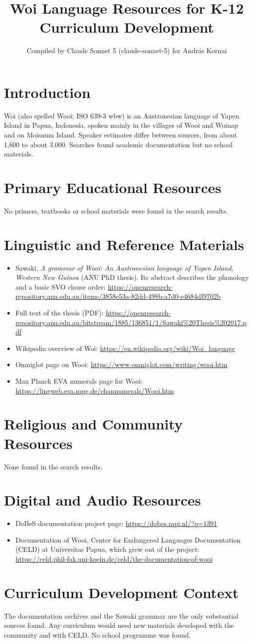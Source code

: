 \documentclass[12pt]{article}
\title{Woi Language Resources for K-12 Curriculum Development}
\author{Compiled by Claude Sonnet 5 (claude-sonnet-5) for Andr\'as Kornai}
\date{}
\begin{document}
\maketitle

\section{Introduction}
Woi (also spelled Wooi; ISO 639-3 wbw) is an Austronesian language of Yapen Island in Papua, Indonesia, spoken mainly in the villages of Wooi and Woinap and on Moisnum Island. Speaker estimates differ between sources, from about 1,600 to about 3,000. Searches found academic documentation but no school materials.

\section{Primary Educational Resources}
No primers, textbooks or school materials were found in the search results.

\section{Linguistic and Reference Materials}
\begin{itemize}
\item Sawaki, \emph{A grammar of Wooi: An Austronesian language of Yapen Island, Western New Guinea} (ANU PhD thesis). Its abstract describes the phonology and a basic SVO clause order: \url{https://openresearch-repository.anu.edu.au/items/3858e53a-82dd-498b-a7d0-e4684df9702b}
\item Full text of the thesis (PDF): \url{https://openresearch-repository.anu.edu.au/bitstream/1885/136851/1/Sawaki%20Thesis%202017.pdf}
\item Wikipedia overview of Woi: \url{https://en.wikipedia.org/wiki/Woi_language}
\item Omniglot page on Wooi: \url{https://www.omniglot.com/writing/wooi.htm}
\item Max Planck EVA numerals page for Wooi: \url{https://lingweb.eva.mpg.de/channumerals/Wooi.htm}
\end{itemize}

\section{Religious and Community Resources}
None found in the search results.

\section{Digital and Audio Resources}
\begin{itemize}
\item DoBeS documentation project page: \url{https://dobes.mpi.nl/?p=1391}
\item Documentation of Wooi, Center for Endangered Languages Documentation (CELD) at Universitas Papua, which grew out of the project: \url{https://celd.phil-fak.uni-koeln.de/celd/the-documentation-of-wooi}
\end{itemize}

\section{Curriculum Development Context}
The documentation archives and the Sawaki grammar are the only substantial sources found. Any curriculum would need new materials developed with the community and with CELD. No school programme was found.
\end{document}
